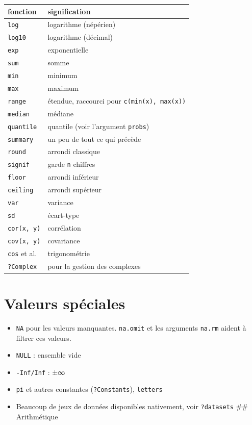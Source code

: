 \documentclass[
  letterpaper,
  DIV=11,
  numbers=noendperiod]{scrreprt}
\providecommand{\tightlist}{%
  \setlength{\itemsep}{0pt}\setlength{\parskip}{0pt}}\usepackage{longtable,booktabs,array}
\begin{document}
\begin{longtable}[]{@{}ll@{}}
\toprule\noalign{}
fonction & signification \\
\midrule\noalign{}
\endhead
\bottomrule\noalign{}
\endlastfoot
\texttt{log} & logarithme (népérien) \\
\texttt{log10} & logarithme (décimal) \\
\texttt{exp} & exponentielle \\
\texttt{sum} & somme \\
\texttt{min} & minimum \\
\texttt{max} & maximum \\
\texttt{range} & étendue, raccourci pour \texttt{c(min(x),\ max(x))} \\
\texttt{median} & médiane \\
\texttt{quantile} & quantile (voir l'argument \texttt{probs}) \\
\texttt{summary} & un peu de tout ce qui précède \\
\texttt{round} & arrondi classique \\
\texttt{signif} & garde \texttt{n} chiffres \\
\texttt{floor} & arrondi inférieur \\
\texttt{ceiling} & arrondi supérieur \\
\texttt{var} & variance \\
\texttt{sd} & écart-type \\
\texttt{cor(x,\ y)} & corrélation \\
\texttt{cov(x,\ y)} & covariance \\
\texttt{cos} et al. & trigonométrie \\
\texttt{?Complex} & pour la gestion des complexes \\
\end{longtable}

\hypertarget{valeurs-spuxe9ciales}{%
\section{Valeurs spéciales}\label{valeurs-spuxe9ciales}}

\begin{itemize}
\tightlist
\item
  \texttt{NA} pour les valeurs manquantes. \texttt{na.omit} et les
  arguments \texttt{na.rm} aident à filtrer ces valeurs.
\item
  \texttt{NULL} : ensemble vide
\item
  \texttt{-Inf/Inf} : ±∞
\item
  \texttt{pi} et autres constantes (\texttt{?Constants}),
  \texttt{letters}
\item
  Beaucoup de jeux de données disponibles nativement, voir
  \texttt{?datasets} \#\# Arithmétique
\end{itemize}
\end{document}
